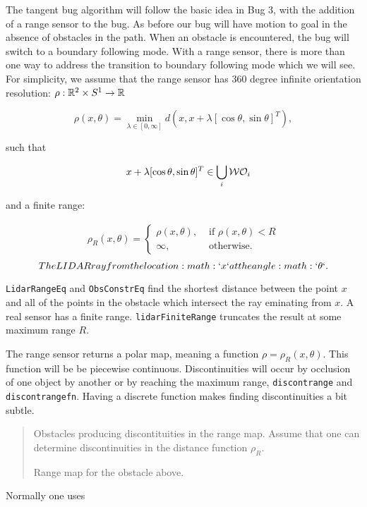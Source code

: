 The tangent bug algorithm will follow the basic idea in Bug 3, with the
addition of a range sensor to the bug. As before our bug will have
motion to goal in the absence of obstacles in the path. When an obstacle
is encountered, the bug will switch to a boundary following mode. With a
range sensor, there is more than one way to address the transition to
boundary following mode which we will see. For simplicity, we assume
that the range sensor has 360 degree infinite orientation resolution:
\(\rho:  \Bbb R^2 \times S^1 \to \Bbb R\)

\[\rho (x,\theta) = \min_{\lambda\in [0,\infty]} d(x,x+\lambda [\cos\theta , \sin\theta ]^T),\]

such that

\[\quad x+\lambda [\cos\theta , \sin\theta ]^T \in \bigcup_i {\cal W}{\cal O}_i\]

and a finite range:

\[\begin{aligned}
\rho_R(x,\theta) = \left\{ \begin{array}{ll} \rho(x,\theta), & \text{ if } \rho(x,\theta) < R \\
                              \infty, & \text{ otherwise}.
                             \end{array}\right.
\end{aligned}\]\[The LIDAR ray from the location :math:`x` at the angle :math:`\theta`.\]

\texttt{LidarRangeEq} and \texttt{ObsConstrEq} find the shortest
distance between the point \(x\) and all of the points in the obstacle
which intersect the ray eminating from \(x\). A real sensor has a finite
range. \texttt{lidarFiniteRange} truncates the result at some maximum
range \(R\).

The range sensor returns a polar map, meaning a function
\(\rho = \rho_R(x,\theta)\). This function will be be piecewise
continuous. Discontinuities will occur by occlusion of one object by
another or by reaching the maximum range, \texttt{discontrange} and
\texttt{discontrangefn}. Having a discrete function makes finding
discontinuities a bit subtle.

\begin{quote}
Obstacles producing discontituities in the range map. Assume that one
can determine discontinuities in the distance function \(\rho_R\).

Range map for the obstacle above.
\end{quote}

Normally one uses

